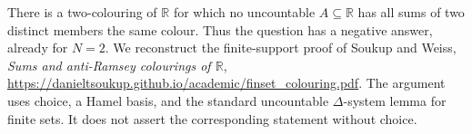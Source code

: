 There is a two-colouring of $\mathbb R$ for which no uncountable $A\subseteq\mathbb R$ has all sums of two distinct members the same colour. Thus the question has a negative answer, already for $N=2$. We reconstruct the finite-support proof of Soukup and Weiss, \emph{Sums and anti-Ramsey colourings of $\mathbb R$}, \url{https://danieltsoukup.github.io/academic/finset_colouring.pdf}. The argument uses choice, a Hamel basis, and the standard uncountable $\Delta$-system lemma for finite sets. It does not assert the corresponding statement without choice.
